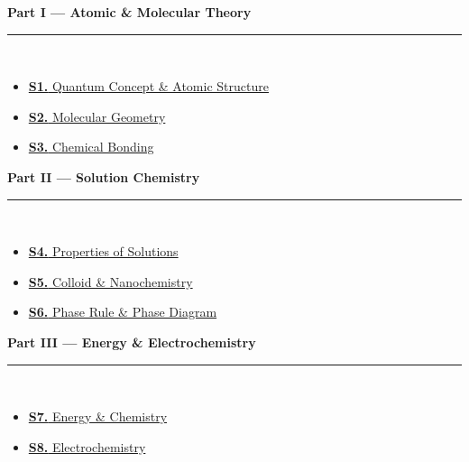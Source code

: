 \documentclass[12pt,a3paper]{article}
\begin{document}
\begin{tcolorbox}[colback=cA!5,colframe=cA,boxrule=1pt,arc=5pt,
  left=8pt,right=8pt,top=8pt,bottom=8pt,before skip=4pt]
  {\large\bfseries\textcolor{cA}{Part I --- Atomic \& Molecular Theory}}\\[5pt]
  \textcolor{cA!40}{\rule{\textwidth}{0.4pt}}\\[3pt]
  \small\begin{itemize}[leftmargin=1.2em,itemsep=1pt,label={\textcolor{cA}{$\triangleright$}}]
    \item \hyperref[sec:S1]{\textbf{S1.} Quantum Concept \& Atomic Structure}
    \item \hyperref[sec:S2]{\textbf{S2.} Molecular Geometry}
    \item \hyperref[sec:S3]{\textbf{S3.} Chemical Bonding}
  \end{itemize}
\end{tcolorbox}

\begin{tcolorbox}[colback=cB!5,colframe=cB,boxrule=1pt,arc=5pt,
  left=8pt,right=8pt,top=8pt,bottom=8pt,before skip=4pt]
  {\large\bfseries\textcolor{cB}{Part II --- Solution Chemistry}}\\[5pt]
  \textcolor{cB!40}{\rule{\textwidth}{0.4pt}}\\[3pt]
  \small\begin{itemize}[leftmargin=1.2em,itemsep=1pt,label={\textcolor{cB}{$\triangleright$}}]
    \item \hyperref[sec:S4]{\textbf{S4.} Properties of Solutions}
    \item \hyperref[sec:S5]{\textbf{S5.} Colloid \& Nanochemistry}
    \item \hyperref[sec:S6]{\textbf{S6.} Phase Rule \& Phase Diagram}
  \end{itemize}
\end{tcolorbox}

\begin{tcolorbox}[colback=cC!5,colframe=cC,boxrule=1pt,arc=5pt,
  left=8pt,right=8pt,top=8pt,bottom=8pt,before skip=4pt]
  {\large\bfseries\textcolor{cC}{Part III --- Energy \& Electrochemistry}}\\[5pt]
  \textcolor{cC!40}{\rule{\textwidth}{0.4pt}}\\[3pt]
  \small\begin{itemize}[leftmargin=1.2em,itemsep=1pt,label={\textcolor{cC}{$\triangleright$}}]
    \item \hyperref[sec:S7]{\textbf{S7.} Energy \& Chemistry}
    \item \hyperref[sec:S8]{\textbf{S8.} Electrochemistry}
  \end{itemize}
\end{tcolorbox}
\end{document}
